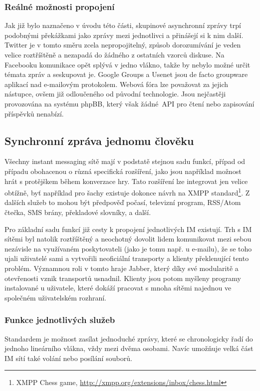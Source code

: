 \documentclass[12pt,oneside,final]{fithesis2}
\begin{document}
\subsubsection*{Reálné možnosti propojení}
Jak již bylo naznačeno v úvodu této části, skupinové asynchronní zprávy trpí podobnými překážkami jako zprávy mezi jednotlivci a přinášejí si k nim další. Twitter je v tomto směru zcela nepropojitelný, způsob dorozumívání je veden velice roztříštěně a nezapadá do žádného z ostatních vzorců diskuse. Na Facebooku komunikace opět splývá v jedno vlákno, takže by nebylo možné určit témata zpráv a seskupovat je. Google Groups a Usenet jsou de facto groupware aplikací nad e-mailovým protokolem. Webová fóra lze považovat za jejich nástupce, ovšem již odloučeného od původní technologie. Jsou nejčastěji provozována na systému phpBB, který však žádné~API pro čtení nebo zapisování příspěvků nenabízí.

\subsection{Synchronní zpráva jednomu člověku}
Všechny instant messaging sítě mají v podstatě stejnou sadu funkcí, případ od případu obohacenou o různá specifická rozšíření, jako jsou například možnost hrát s protějškem během konverzace hry. Tato rozšíření lze integrovat jen velice obtížně, byť například pro šachy existuje dokonce návrh na XMPP standard\footnote{XMPP Chess game, \url{http://xmpp.org/extensions/inbox/chess.html}}. Z dalších služeb to mohou být předpověď počasí, televizní program, RSS/Atom čtečka, SMS brány, překladové slovníky, a další.

Pro základní sadu funkcí již cesty k propojení jednotlivých IM existují. Trh s IM sítěmi byl natolik roztříštěný a neochotný dovolit lidem komunikovat mezi sebou nezávisle na využívaném poskytovateli (jako je tomu např. u e-mailu), že se toho ujali uživatelé sami a vytvořili neoficiální transporty a klienty překlenující tento problém. Významnou roli v tomto hraje Jabber, který díky své modularitě a otevřenosti vznik transportů usnadnil. Klienty jsou potom myšleny programy instalované u uživatele, které dokáží pracovat s mnoha sítěmi najednou ve společném uživatelském rozhraní.

\subsubsection*{Funkce jednotlivých služeb}
Standardem je možnost zasílat jednoduché zprávy, které se chronologicky řadí do jednoho lineárního vlákna, vždy mezi dvěma osobami. Navíc umožňuje velká část IM sítí také volání nebo posílání souborů.
\end{document}
